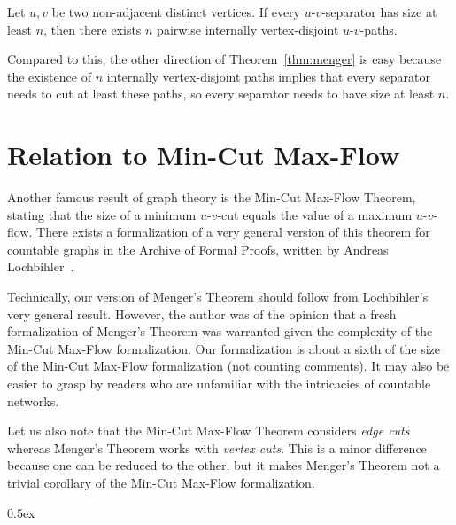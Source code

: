 \documentclass[11pt,a4paper,DIV=11]{scrartcl}
\begin{document}
\begin{theorem}
  Let $u,v$ be two non-adjacent distinct vertices.  If every
  $u$-$v$-separator has size at least $n$, then there exists $n$
  pairwise internally vertex-disjoint $u$-$v$-paths.
\end{theorem}

Compared to this, the other direction of Theorem~\ref{thm:menger} is
easy because the existence of $n$ internally vertex-disjoint paths
implies that every separator needs to cut at least these paths, so
every separator needs to have size at least $n$.

\section{Relation to Min-Cut Max-Flow}

Another famous result of graph theory is the Min-Cut Max-Flow Theorem,
stating that the size of a minimum $u$-$v$-cut equals the value of a
maximum $u$-$v$-flow.  There exists a formalization of a very general
version of this theorem for countable graphs in the Archive of Formal
Proofs, written by Andreas Lochbihler~\cite{MFMC_Countable-AFP}.

Technically, our version of Menger's Theorem should follow from
Lochbihler's very general result.  However, the author was of the
opinion that a fresh formalization of Menger's Theorem was warranted
given the complexity of the Min-Cut Max-Flow formalization.  Our
formalization is about a sixth of the size of the Min-Cut Max-Flow
formalization (not counting comments).  It may also be easier to grasp
by readers who are unfamiliar with the intricacies of countable
networks.

Let us also note that the Min-Cut Max-Flow Theorem considers
\emph{edge cuts} whereas Menger's Theorem works with \emph{vertex
  cuts}.  This is a minor difference because one can be reduced to the
other, but it makes Menger's Theorem not a trivial corollary of the
Min-Cut Max-Flow formalization.


\parindent 0pt\parskip 0.5ex



\clearpage
{}
{}


\end{document}
